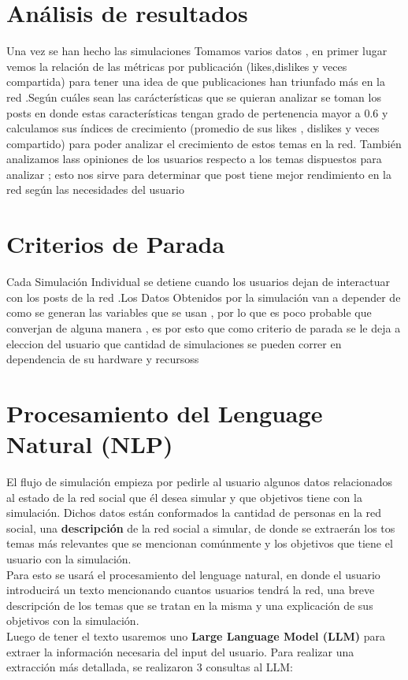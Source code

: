 \documentclass[acmtog]{acmart}
\begin{document}
\section{Análisis de resultados}
Una vez se han hecho las simulaciones Tomamos varios datos , en primer lugar vemos la relación de las métricas por publicación (likes,dislikes y veces compartida) para tener una idea de que publicaciones han triunfado más en la red .Según cuáles sean las carácterísticas que se quieran analizar se toman los posts en donde estas características tengan grado de pertenencia mayor a 0.6 y calculamos sus índices de crecimiento (promedio de sus likes , dislikes y veces compartido) para poder analizar el crecimiento de estos temas en la red. También analizamos lass opiniones de los usuarios respecto a los temas dispuestos para analizar ; esto nos sirve para determinar que post tiene mejor rendimiento en la red según las necesidades del usuario

\section{Criterios de Parada}

Cada Simulación Individual se detiene cuando los usuarios dejan de interactuar con los posts de la red .Los Datos Obtenidos por la simulación van a depender de como se generan las variables que se usan , por lo que es poco probable que converjan de alguna manera , es por esto que como criterio de parada se le deja a eleccion del usuario que cantidad de simulaciones se pueden correr en dependencia de su hardware y recursoss

\section{Procesamiento del Lenguage Natural (NLP)}

El flujo de simulación empieza por pedirle al usuario algunos datos relacionados al estado de la red social que él desea simular y que objetivos tiene con la simulación.
Dichos datos están conformados la cantidad de personas en la red social, una \textbf{descripción} de la red social a simular, de donde se extraerán los tos temas más 
relevantes que se mencionan comúnmente y los objetivos que tiene  el usuario con la simulación.
\\
Para esto se usará el procesamiento del lenguage natural, en donde el usuario introducirá un texto mencionando cuantos usuarios tendrá la red, una breve descripción de los
temas que se tratan en la misma y una explicación de sus objetivos con la simulación.
\\
Luego de tener el texto usaremos uno \textbf{Large Language Model (LLM)} para extraer la información necesaria del input del usuario.
Para realizar una extracción más detallada, se realizaron 3 consultas al LLM: 
\end{document}
